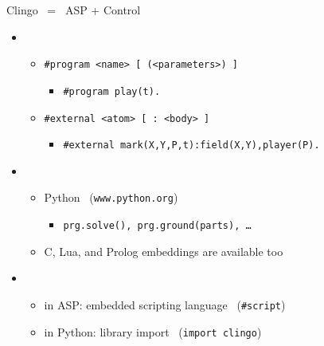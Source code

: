 \begin{frame}[c]{Clingo \ = \ ASP + Control}
  \begin{itemize}
  \item<2-> 
    \begin{itemize}
    \item<2-> \texttt{\#program <name> [ (<parameters>) ]}
      \begin{itemize}
      \item<3->    \texttt{\#program play(t).}
      \end{itemize}
    \item <2->\texttt{\#external <atom> [ : <body> ]}
      \begin{itemize}
      \item<3->  \texttt{\#external mark(X,Y,P,t)\;:\;field(X,Y),\;player(P).}
      \end{itemize}
    \end{itemize}
    \medskip
  \item<4-> 
    \begin{itemize}
    \item<4-> Python \ (\texttt{www.python.org})
      \begin{itemize}
      \item<5->  \texttt{prg.solve(), prg.ground(parts), \dots}
      \end{itemize}
    \item <6-> C, Lua, and Prolog embeddings are available too
    \end{itemize}
    \medskip
    \item<7-> 
      \begin{itemize}
      \item <7-> in ASP: embedded scripting language \ (\texttt{\#script})
      \item <7-> in Python: library import \ (\texttt{import clingo})
      \end{itemize}
  \end{itemize}
\end{frame}
